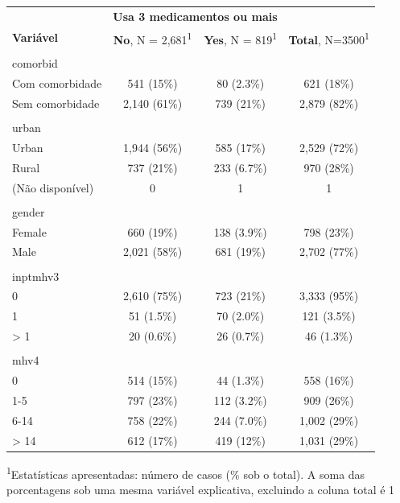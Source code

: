 \documentclass[
  11pt,
]{article}
\begin{document}
\captionsetup[table]{labelformat=empty,skip=1pt}
\begin{longtable}{lccc}
\toprule
& \multicolumn{2}{c}{\textbf{Usa 3 medicamentos ou mais}} & \\ 
 \cmidrule(lr){2-3}
\textbf{Variável} & \textbf{No}, N = 2,681\textsuperscript{1} & \textbf{Yes}, N = 819\textsuperscript{1} & \textbf{Total}, N=3500\textsuperscript{1} \\ 
\midrule
\multicolumn{1}{l}{ } \\ 
\midrule
comorbid &  &  &  \\ 
Com comorbidade & 541 (15\%) & 80 (2.3\%) & 621 (18\%) \\ 
Sem comorbidade & 2,140 (61\%) & 739 (21\%) & 2,879 (82\%) \\ 
\midrule
\multicolumn{1}{l}{  } \\ 
\midrule
urban &  &  &  \\ 
Urban & 1,944 (56\%) & 585 (17\%) & 2,529 (72\%) \\ 
Rural & 737 (21\%) & 233 (6.7\%) & 970 (28\%) \\ 
(Não disponível) & 0 & 1 & 1 \\ 
\midrule
\multicolumn{1}{l}{   } \\ 
\midrule
gender &  &  &  \\ 
Female & 660 (19\%) & 138 (3.9\%) & 798 (23\%) \\ 
Male & 2,021 (58\%) & 681 (19\%) & 2,702 (77\%) \\ 
\midrule
\multicolumn{1}{l}{    } \\ 
\midrule
inptmhv3 &  &  &  \\ 
0 & 2,610 (75\%) & 723 (21\%) & 3,333 (95\%) \\ 
1 & 51 (1.5\%) & 70 (2.0\%) & 121 (3.5\%) \\ 
> 1 & 20 (0.6\%) & 26 (0.7\%) & 46 (1.3\%) \\ 
\midrule
\multicolumn{1}{l}{     } \\ 
\midrule
mhv4 &  &  &  \\ 
0 & 514 (15\%) & 44 (1.3\%) & 558 (16\%) \\ 
1-5 & 797 (23\%) & 112 (3.2\%) & 909 (26\%) \\ 
6-14 & 758 (22\%) & 244 (7.0\%) & 1,002 (29\%) \\ 
> 14 & 612 (17\%) & 419 (12\%) & 1,031 (29\%) \\ 
\bottomrule
\end{longtable}
\vspace{-5mm}
\begin{minipage}{\linewidth}
\textsuperscript{1}Estatísticas apresentadas: número de casos (\% sob o total). A soma das porcentagens sob uma mesma variável explicativa, excluindo a coluna total é 1 \\ 
\end{minipage}
\end{document}

